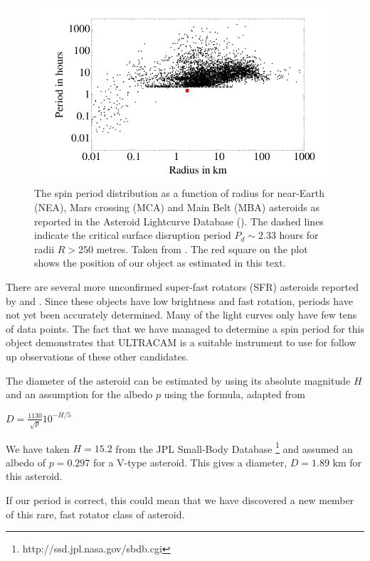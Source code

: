   \begin{figure}
    \center
    \includegraphics[width=110mm]{images/jacobson-asteroid-rotation-dot.png} 
    \caption{The spin period distribution as a function of radius for near-Earth (NEA), Mars crossing (MCA) and Main Belt (MBA) asteroids as reported in the Asteroid Lightcurve Database (\cite{2009Icar..202..134W}). The dashed lines indicate the critical surface disruption period $P_d \sim 2.33$ hours for radii $R > 250$ metres. Taken from \cite{Jacobson2014}. The red square on the plot shows the position of our object as estimated in this text.}
    \label{fig:spinrotationcutoff}
  \end{figure}
  

There are several more unconfirmed super-fast rotators (SFR) asteroids reported by \citet{Masiero2009} and \citet{Dermawan2011}. Since these objects have low brightness and fast rotation, periods have not yet been accurately determined. Many of the light curves only have few tens of data points. The fact that we have managed to determine a spin period for this object demonstrates that ULTRACAM is a suitable instrument to use for follow up observations of these other candidates.  

The diameter of the asteroid can be estimated by using its absolute magnitude $H$ and an assumption for the albedo $p$ using the formula, adapted from \citet{Jewitt2013}

$D = \frac{1130}{\sqrt{p}}10^{-H/5} $

We have taken $H = 15.2$ from the JPL Small-Body Database \footnote{http://ssd.jpl.nasa.gov/sbdb.cgi} and assumed an albedo of $ p = 0.297$ for a V-type asteroid. This gives a diameter, $D = 1.89$ km for this asteroid. 

If our period is correct, this could mean that we have discovered a new member of this rare, fast rotator class of asteroid. 

